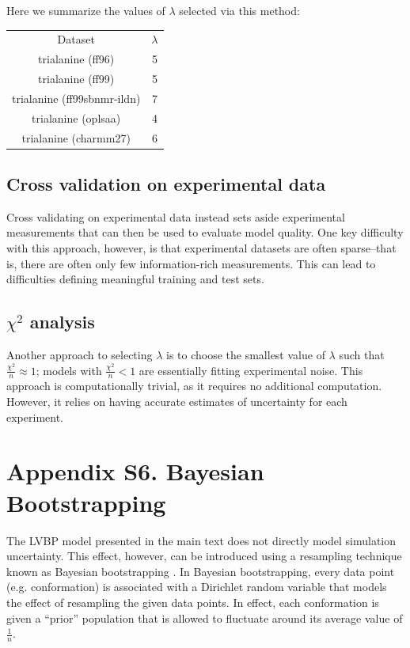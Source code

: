 \documentclass[journal=jacsat,manuscript=article]{achemso}
\begin{document}
Here we summarize the values of $\lambda$ selected via this method:

\begin{table}
\begin{tabular}{c|c}
Dataset                   & $\lambda$  \\
trialanine (ff96)               & 5 \\
trialanine (ff99)               & 5 \\ 
trialanine (ff99sbnmr-ildn)     & 7 \\ 
trialanine (oplsaa)             & 4 \\ 
trialanine (charmm27)           & 6 \\

\end{tabular} 
\end{table}


\subsection{Cross validation on experimental data}

Cross validating on experimental data instead sets aside experimental measurements that can then be used to evaluate model quality.  One key difficulty with this approach, however, is that experimental datasets are often sparse--that is, there are often only few information-rich measurements.  This can lead to difficulties defining meaningful training and test sets.  

\subsection{$\chi^2$ analysis}

Another approach to selecting $\lambda$ is to choose the smallest value of $\lambda$ such that $\frac{\chi^2}{n} \approx 1$; models with $\frac{\chi^2}{n} < 1$ are essentially fitting experimental noise.  This approach is computationally trivial, as it requires no additional computation.  However, it relies on having accurate estimates of uncertainty for each experiment.  

\section{Appendix S6.  Bayesian Bootstrapping}

The LVBP model presented in the main text does not directly model simulation uncertainty.  This effect, however, can be introduced using a resampling technique known as Bayesian bootstrapping \cite{rubin1981}.  In Bayesian bootstrapping, every data point (e.g. conformation) is associated with a Dirichlet random variable that models the effect of resampling the given data points.  In effect, each conformation is given a ``prior'' population that is allowed to fluctuate around its average value of $\frac{1}{n}$.  
\end{document}
